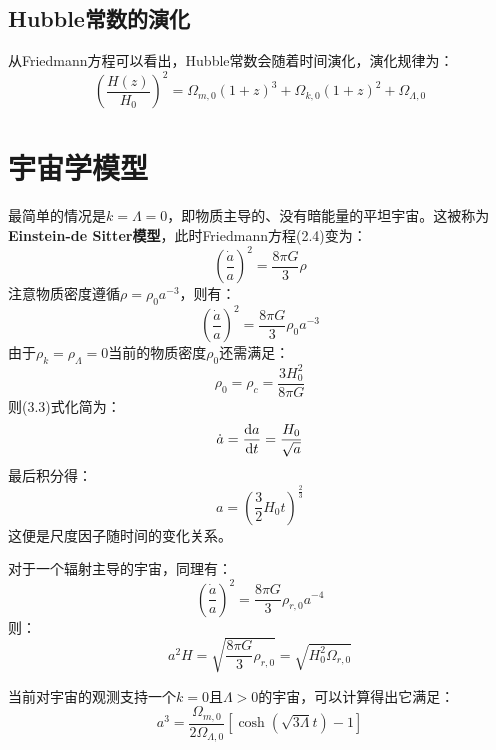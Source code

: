 \documentclass[fontset=none,openany,a4paper]{ctexbook}
\begin{document}
\section{Hubble常数的演化}

从Friedmann方程可以看出，Hubble常数会随着时间演化，演化规律为：
\begin{equation}
    \left(\frac{H(z)}{H_0}\right)^2 = \Omega_{m,0}(1 + z)^3 + \Omega_{k,0} (1 + z)^2 + \Omega_{\Lambda,0}
\end{equation}

\chapter{宇宙学模型}

最简单的情况是$k = \Lambda = 0$，即物质主导的、没有暗能量的平坦宇宙。这被称为\textbf{Einstein-de Sitter模型}，此时Friedmann方程(2.4)变为：
\begin{equation}
    \left(\frac{\dot{a}}{a}\right)^2 = \frac{8\pi G}{3}\rho
\end{equation}
注意物质密度遵循$\rho = \rho_0 a^{-3}$，则有：
\begin{equation}
    \left(\frac{\dot{a}}{a}\right)^2 = \frac{8\pi G}{3}\rho_0 a^{-3}
\end{equation}
由于$\rho_k = \rho_\Lambda = 0$当前的物质密度$\rho_0$还需满足：
\begin{equation}
    \rho_0 = \rho_c = \frac{3H_0^2}{8\pi G}
\end{equation}
则(3.3)式化简为：
\begin{equation}
    \dot{a} = \dv{a}{t} = \frac{H_0}{\sqrt{a}}
\end{equation}
最后积分得：
\begin{equation}
    a = \left(\frac{3}{2}H_0 t\right)^{\tfrac{2}{3}}
\end{equation}
这便是尺度因子随时间的变化关系。

对于一个辐射主导的宇宙，同理有：
\begin{equation}
    \left(\frac{\dot{a}}{a}\right)^2 = \frac{8\pi G}{3}\rho_{r,0} a^{-4}
\end{equation}
则：
\begin{equation}
    a^2 H = \sqrt{\frac{8\pi G}{3}\rho_{r,0}} = \sqrt{H_0^2 \Omega_{r,0}}
\end{equation}

当前对宇宙的观测支持一个$k = 0$且$\Lambda > 0$的宇宙，可以计算得出它满足：
\begin{equation}
    a^3 = \frac{\Omega_{m,0}}{2\Omega_{\Lambda,0}}[\cosh(\sqrt{3\Lambda}t) - 1]
\end{equation}
\end{document}
